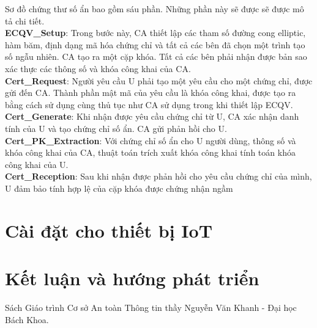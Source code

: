 \documentclass[a4paper,12pt]{report}
\begin{document}
Sơ đồ chứng thư số ẩn bao gồm sáu phần. Những phần này sẽ được sẽ được mô tả chi tiết.\\
\textbf{ECQV\_Setup}: Trong bước này, CA thiết lập các tham số đường cong elliptic, hàm băm, định dạng mã hóa chứng chỉ và tất cả các bên đã chọn một trình tạo số ngẫu nhiên. CA tạo ra một cặp khóa. Tất cả các bên phải nhận được bản sao xác thực các thông số và khóa công khai của CA. \\[6pt]
\textbf{Cert\_Request}: Người yêu cầu U phải tạo một yêu cầu cho một chứng chỉ, được gửi đến CA. Thành phần mật mã của yêu cầu là khóa công khai, được tạo ra bằng cách sử dụng cùng thủ tục như CA sử dụng trong khi thiết lập ECQV. \\ [6pt]
\textbf{Cert\_Generate}: Khi nhận được yêu cầu chứng chỉ từ U, CA xác nhận danh tính của U và tạo chứng chỉ số ẩn. CA gửi phản hồi cho U. \\ [6pt]
\textbf{Cert\_PK\_Extraction}: Với chứng chỉ số ẩn cho U người dùng, thông số và khóa công khai của CA, thuật toán trích xuất khóa công khai tính toán khóa công khai của U. \\ [6pt]
\textbf{Cert\_Reception}: Sau khi nhận được phản hồi cho yêu cầu chứng chỉ của mình, U đảm bảo tính hợp lệ của cặp khóa được chứng nhận ngầm
\subsection{}
\chapter{Cài đặt cho thiết bị IoT}
\chapter*{Kết luận và hướng phát triển}
\begin{thebibliography}{9}
 Sách Giáo trình Cơ sở An toàn Thông tin thầy Nguyễn Văn Khanh - Đại học Bách Khoa.
\end{thebibliography}
\end{document}
